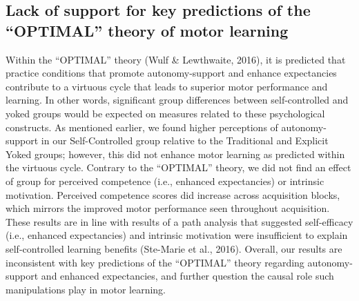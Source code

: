 \documentclass[
  english,
  jou]{apa7}
\begin{document}
\hypertarget{lack-of-support-for-key-predictions-of-the-optimal-theory-of-motor-learning}{%
\subsection{Lack of support for key predictions of the ``OPTIMAL'' theory of motor learning}\label{lack-of-support-for-key-predictions-of-the-optimal-theory-of-motor-learning}}

Within the ``OPTIMAL'' theory (Wulf \& Lewthwaite, 2016), it is predicted that practice conditions that promote autonomy-support and enhance expectancies contribute to a virtuous cycle that leads to superior motor performance and learning. In other words, significant group differences between self-controlled and yoked groups would be expected on measures related to these psychological constructs. As mentioned earlier, we found higher perceptions of autonomy-support in our Self-Controlled group relative to the Traditional and Explicit Yoked groups; however, this did not enhance motor learning as predicted within the virtuous cycle. Contrary to the ``OPTIMAL'' theory, we did not find an effect of group for perceived competence (i.e., enhanced expectancies) or intrinsic motivation. Perceived competence scores did increase across acquisition blocks, which mirrors the improved motor performance seen throughout acquisition. These results are in line with results of a path analysis that suggested self-efficacy (i.e., enhanced expectancies) and intrinsic motivation were insufficient to explain self-controlled learning benefits (Ste-Marie et al., 2016). Overall, our results are inconsistent with key predictions of the ``OPTIMAL'' theory regarding autonomy-support and enhanced expectancies, and further question the causal role such manipulations play in motor learning.
\end{document}
